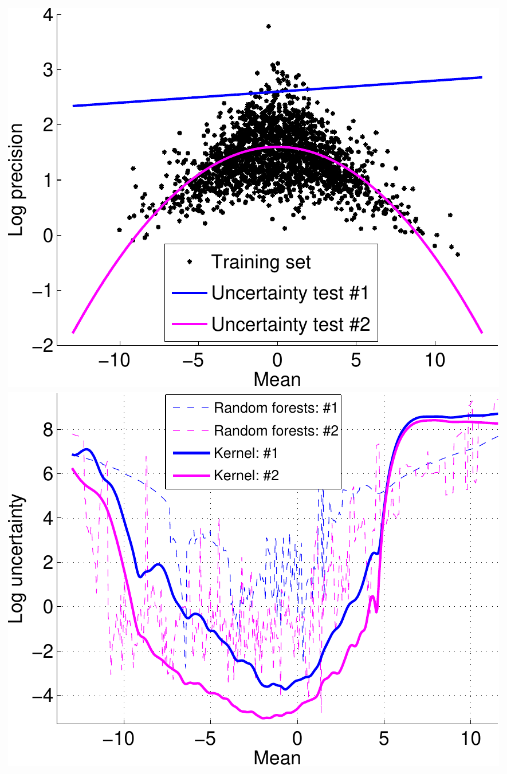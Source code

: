 \documentclass[25pt, a0paper, portrait, margin=0mm, innermargin=10mm,
     blockverticalspace=7mm, colspace=8mm, subcolspace=8mm]{tikzposter} %
\newcommand{\factor}{f}				%
\newcommand{\msg}[2]{m_{#1 \rightarrow #2}}			%
\begin{document}
\begin{columns}
{\begin{itemize}
\begin{tikzfigure}
  \hspace{-10cm}
  \includegraphics[width=13cm]{uncertainty/logistic_uncertainty_test-crop}
  \hspace{2cm}
      \includegraphics[width=13cm]{uncertainty/logistic_uncertainty_all-crop}


\end{tikzfigure}
\end{itemize}}
\end{columns}
\end{document}
